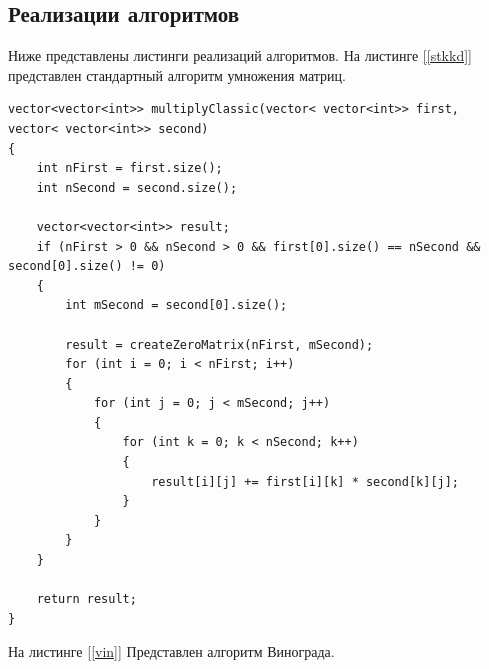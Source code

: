 \documentclass{article}
\begin{document}
	\subsection{Реализации алгоритмов}
	Ниже представлены листинги реализаций алгоритмов.
	На листинге \hyperref[stkkd]{[\ref{stkkd}]} представлен стандартный алгоритм умножения матриц.
	\begin{lstlisting}[label=stkkd, caption=Стандартный алгоритм умножения матриц]
	vector<vector<int>> multiplyClassic(vector< vector<int>> first, vector< vector<int>> second)
{
    int nFirst = first.size();
    int nSecond = second.size();
   
    vector<vector<int>> result;
    if (nFirst > 0 && nSecond > 0 && first[0].size() == nSecond && second[0].size() != 0)
    {
        int mSecond = second[0].size();

        result = createZeroMatrix(nFirst, mSecond);
        for (int i = 0; i < nFirst; i++)
        {
            for (int j = 0; j < mSecond; j++)
            {
                for (int k = 0; k < nSecond; k++)
                {
                    result[i][j] += first[i][k] * second[k][j];
                }
            }
        }
    }

    return result;
}
	\end{lstlisting}
		На листинге \hyperref[vin]{[\ref{vin}]} Представлен алгоритм Винограда.
\end{document}
